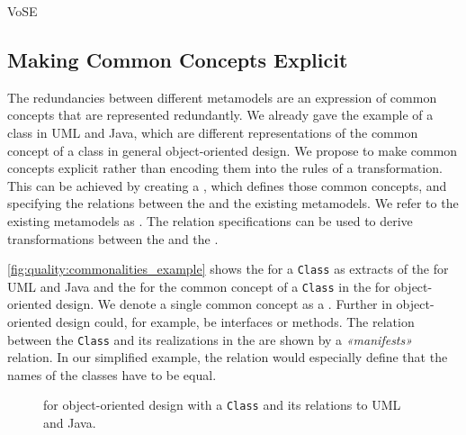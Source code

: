 \begin{copiedFrom}{VoSE}


\subsection*{Making Common Concepts Explicit}

The redundancies between different metamodels are an expression of common concepts that are represented redundantly.
We already gave the example of a class in UML and Java, which are different representations of the common concept of a class in general object-oriented design.
We propose to make common concepts explicit rather than encoding them into the rules of a transformation.
This can be achieved by creating a \emph{\conceptmetamodel}, which defines those common concepts, and specifying the relations between the \conceptmetamodel and the existing metamodels.
We refer to the existing metamodels as \emph{\concretemetamodels}.
The relation specifications can be used to derive transformations between the \concretemetamodels and the \conceptmetamodel.

\autoref{fig:quality:commonalities_example} shows the \metaclasses for a \texttt{Class} as extracts of the \concretemetamodels for UML and Java and the \metaclass for the common concept of a \texttt{Class} in the \conceptmetamodel for object-oriented design.
We denote a single common concept as a \emph{\commonality}.
Further \commonalities in object-oriented design could, for example, be interfaces or methods.
The relation between the \texttt{Class} \commonality and its realizations in the \concretemetamodels are shown by a \emph{«manifests»} relation.
In our simplified example, the relation would especially define that the names of the classes have to be equal. %

\begin{figure}
    \centering
    
    \caption[Concept metamodel for object-oriented design]{\Conceptmetamodel for object-oriented design with a \texttt{Class} \commonality and its relations to UML and Java.}
    \label{fig:quality:commonalities_example}
\end{figure}


\end{copiedFrom}
